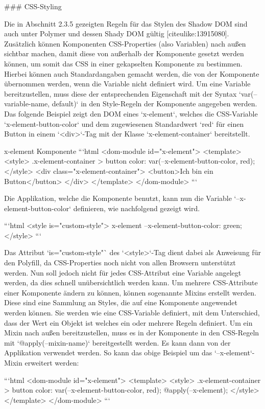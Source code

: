 ### CSS-Styling

Die in Abschnitt 2.3.5 gezeigten Regeln für das Stylen des Shadow DOM sind auch unter Polymer und dessen Shady DOM gültig [citeulike:13915080]. Zusätzlich können Komponenten CSS-Properties (also Variablen) nach außen sichtbar machen, damit diese von außerhalb der Komponente gesetzt werden können, um somit das CSS in einer gekapselten Komponente zu bestimmen. Hierbei können auch Standardangaben gemacht werden, die von der Komponente übernommen werden, wenn die Variable nicht definiert wird. Um eine Variable bereitzustellen, muss diese der entsprechenden Eigenschaft mit der Syntax `var(--variable-name, default)` in den Style-Regeln der Komponente angegeben werden. Das folgende Beispiel zeigt den DOM eines `x-element`, welches die CSS-Variable `x-element-button-color` und dem zugewiesenen Standardwert `red` für einen Button in einem `<div>`-Tag mit der Klasse `x-element-container` bereitstellt.

x-element Komponente
```html
<dom-module id="x-element">
  <template>
    <style>
      .x-element-container > button {
        color: var(--x-element-button-color, red);
      }
    </style>
    <div class="x-element-container">
      <button>Ich bin ein Button</button>
    </div>
  </template>
</dom-module>
```

Die Applikation, welche die Komponente benutzt, kann nun die Variable `--x-element-button-color` definieren, wie nachfolgend gezeigt wird.

```html
<style is="custom-style">
  x-element {
    --x-element-button-color: green;
  }
</style>
```

Das Attribut `is="custom-style"` des `<style>`-Tag dient dabei als Anweisung für den Polyfill, da CSS-Properties noch nicht von allen Browsern unterstützt werden. Nun soll jedoch nicht für jedes CSS-Attribut eine Variable angelegt werden, da dies schnell unübersichtlich werden kann. Um mehrere CSS-Attribute einer Komponente ändern zu können, können sogenannte Mixins erstellt werden. Diese sind eine Sammlung an Styles, die auf eine Komponente angewendet werden können. Sie werden wie eine CSS-Variable definiert, mit dem Unterschied, dass der Wert ein Objekt ist welches ein oder mehrere Regeln definiert. Um ein Mixin nach außen bereitzustellen, muss es in der Komponente in den CSS-Regeln mit `@apply(--mixin-name)` bereitgestellt werden. Es kann dann von der Applikation verwendet werden. So kann das obige Beispiel um das `--x-element`-Mixin erweitert werden:

```html
<dom-module id="x-element">
  <template>
    <style>
      .x-element-container > button {
        color: var(--x-element-button-color, red);
        @apply(--x-element);
      }
    </style>
  </template>
</dom-module>
```

